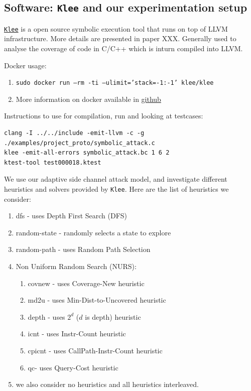 \documentclass[11pt,a4paper,notitlepage]{article}
\begin{document}
\subsection{Software: \texttt{Klee} and our experimentation setup}
\label{subsec:softwares}

\href{https://klee.github.io/}{\texttt{Klee}} is a open source symbolic execution tool that runs on top of LLVM infrastructure.
More details are presented in paper XXX.
Generally used to analyse the coverage of code in C/C++ which is inturn compiled into LLVM. 

Docker usage:
\begin{enumerate}
    \item \texttt{sudo docker run --rm -ti --ulimit='stack=-1:-1' klee/klee}
    \item More information on docker available in \href{http://klee.github.io/releases/docs/v1.3.0/docker/}{github}
\end{enumerate}

Instructions to use for compilation, run and looking at testcases:
\begin{verbatim}
clang -I ../../include -emit-llvm -c -g ./examples/project_proto/symbolic_attack.c
klee -emit-all-errors symbolic_attack.bc 1 6 2
ktest-tool test000018.ktest
\end{verbatim}

We use our adaptive side channel attack model, and investigate different heuristics and solvers provided by \texttt{Klee}.
Here are the list of heuristics we consider:
\begin{enumerate}
\item dfs - uses Depth First Search (DFS)
\item random-state - randomly selects a state to explore
\item random-path - uses Random Path Selection
\item Non Uniform Random Search (NURS):
  \begin{enumerate}
  \item covnew - uses Coverage-New heuristic
  \item md2u - uses Min-Dist-to-Uncovered heuristic
  \item depth - uses $2^d$ ($d$ is depth) heuristic
  \item icnt - uses Instr-Count heuristic
  \item cpicnt - uses CallPath-Instr-Count heuristic
  \item qc- uses Query-Cost heuristic
  \end{enumerate}
\item we also consider no heuristics and all heuristics interleaved.
\end{enumerate}
\end{document}
